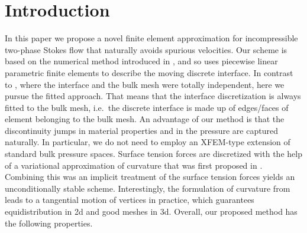\documentclass[a4paper,12pt,onecolumn]{article}
\begin{document}
\captionsetup[subfigure]{labelformat=empty} %

\section{Introduction}\label{sec:introduction}

In this paper we propose a novel finite element approximation for
incompressible two-phase Stokes flow that naturally avoids spurious velocities.
Our scheme is based on the numerical method introduced in \cite{spurious}, and
so uses piecewise linear parametric finite elements to describe the moving
discrete interface. In contrast to \cite{spurious}, where the interface and the
bulk mesh were totally independent, here we pursue the fitted approach. That
means that the interface discretization is always fitted to the bulk mesh, i.e.\
the discrete interface is made up of edges/faces of element belonging to the
bulk mesh. An advantage of our method is that the discontinuity jumps in
material properties and in the pressure are captured naturally. In particular,
we do not need to employ an XFEM-type extension of standard bulk pressure
spaces.
Surface tension forces are discretized with the help of a variational
approximation of curvature that was first proposed in \cite{triplej,gflows3d}.
Combining this was an implicit treatment of the surface tension forces yields an
unconditionally stable scheme. Interestingly, the formulation of curvature from
\cite{triplej} leads to a tangential motion of vertices in practice, which
guarantees equidistribution in 2d and good meshes in 3d. Overall, our proposed
method has the following properties.
\end{document}
